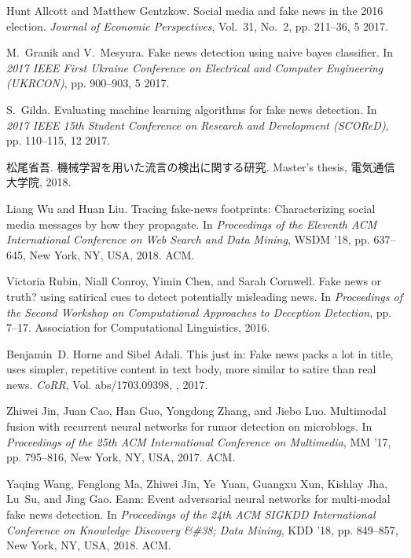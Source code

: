 \begin{thebibliography}{10}

Hunt Allcott and Matthew Gentzkow.
 Social media and fake news in the 2016 election.
 {\em Journal of Economic Perspectives}, Vol.~31, No.~2, pp. 211--36,
  5 2017.

M.~Granik and V.~Mesyura.
 Fake news detection using naive bayes classifier.
 In {\em 2017 IEEE First Ukraine Conference on Electrical and Computer
  Engineering (UKRCON)}, pp. 900--903, 5 2017.

S.~Gilda.
 Evaluating machine learning algorithms for fake news detection.
 In {\em 2017 IEEE 15th Student Conference on Research and Development
  (SCOReD)}, pp. 110--115, 12 2017.

松尾省吾.
 機械学習を用いた流言の検出に関する研究.
 Master's thesis, 電気通信大学院, 2018.

Liang Wu and Huan Liu.
 Tracing fake-news footprints: Characterizing social media messages by
  how they propagate.
 In {\em Proceedings of the Eleventh ACM International Conference on
  Web Search and Data Mining}, WSDM '18, pp. 637--645, New York, NY, USA, 2018.
  ACM.

Victoria Rubin, Niall Conroy, Yimin Chen, and Sarah Cornwell.
 Fake news or truth? using satirical cues to detect potentially
  misleading news.
 In {\em Proceedings of the Second Workshop on Computational
  Approaches to Deception Detection}, pp. 7--17. Association for Computational
  Linguistics, 2016.

Benjamin~D. Horne and Sibel Adali.
 This just in: Fake news packs a lot in title, uses simpler,
  repetitive content in text body, more similar to satire than real news.
 {\em CoRR}, Vol. abs/1703.09398, , 2017.

Zhiwei Jin, Juan Cao, Han Guo, Yongdong Zhang, and Jiebo Luo.
 Multimodal fusion with recurrent neural networks for rumor detection
  on microblogs.
 In {\em Proceedings of the 25th ACM International Conference on
  Multimedia}, MM '17, pp. 795--816, New York, NY, USA, 2017. ACM.

Yaqing Wang, Fenglong Ma, Zhiwei Jin, Ye~Yuan, Guangxu Xun, Kishlay Jha, Lu~Su,
  and Jing Gao.
 Eann: Event adversarial neural networks for multi-modal fake news
  detection.
 In {\em Proceedings of the 24th ACM SIGKDD International Conference
  on Knowledge Discovery \&\#38; Data Mining}, KDD '18, pp. 849--857, New York,
  NY, USA, 2018. ACM.


\end{thebibliography}
